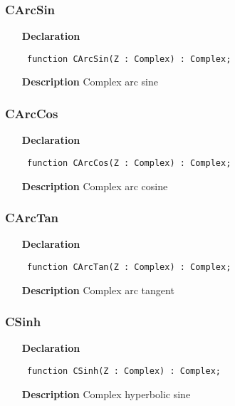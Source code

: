 \documentclass[12pt,a4paper,oneside]{report}
\newcommand{\declarationitem}[1]{\textbf{#1}}
\newcommand{\descriptiontitle}[1]{\textbf{#1}}
\newcommand{\code}[1]{\texttt{#1}}
\begin{document}
\subsubsection{CArcSin}
\label{ucomplex-CArcSin}
\begin{itemize}\item[\declarationitem{Declaration}\hfill]
\begin{flushleft}
\code{
function CArcSin(Z : Complex) : Complex;}

\end{flushleft}

\par
\item[\descriptiontitle{Description}]
Complex arc sine

\end{itemize}
\subsubsection{CArcCos}
\label{ucomplex-CArcCos}
\begin{itemize}\item[\declarationitem{Declaration}\hfill]
\begin{flushleft}
\code{
function CArcCos(Z : Complex) : Complex;}

\end{flushleft}

\par
\item[\descriptiontitle{Description}]
Complex arc cosine

\end{itemize}
\subsubsection{CArcTan}
\label{ucomplex-CArcTan}
\begin{itemize}\item[\declarationitem{Declaration}\hfill]
\begin{flushleft}
\code{
function CArcTan(Z : Complex) : Complex;}

\end{flushleft}

\par
\item[\descriptiontitle{Description}]
Complex arc tangent

\end{itemize}
\subsubsection{CSinh}
\label{ucomplex-CSinh}
\begin{itemize}\item[\declarationitem{Declaration}\hfill]
\begin{flushleft}
\code{
function CSinh(Z : Complex) : Complex;}

\end{flushleft}

\par
\item[\descriptiontitle{Description}]
Complex hyperbolic sine

\end{itemize}
\end{document}
